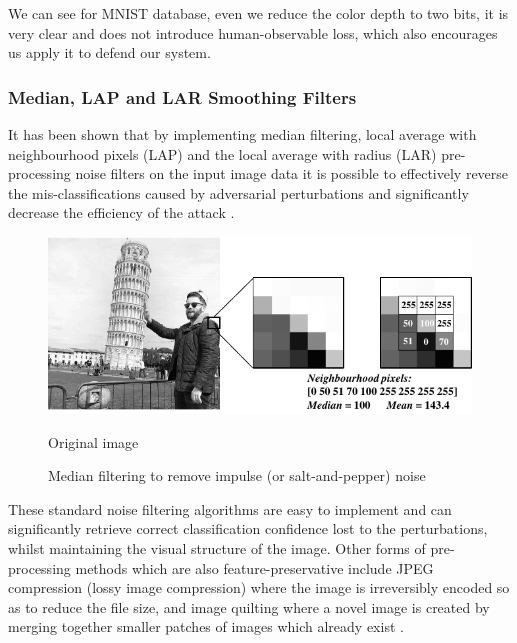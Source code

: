 We can see for MNIST database, even we reduce the color depth to two bits, it is very clear and does not introduce human-observable loss, which also encourages us apply it to defend our system. 


\subsubsection{Median, LAP and LAR Smoothing Filters}
It has been shown that by implementing median filtering, local average with neighbourhood pixels (LAP) and the local average with radius (LAR) pre-processing noise filters on the input image data it is possible to effectively reverse the mis-classifications caused by adversarial perturbations and significantly decrease the efficiency of the attack \cite{khalid2019fademl}. 

\begin{figure}[h!]
	\centering
		\includegraphics[width=.72\textwidth]{Diagram1-cropped.pdf}
		\caption{Original image}
		\label{fig: Median}
	\caption{Median filtering to remove impulse (or salt-and-pepper) noise}
\end{figure}
These standard noise filtering algorithms are easy to implement and can significantly retrieve correct classification confidence lost to the perturbations, whilst maintaining the visual structure of the image. Other forms of pre-processing methods which are also feature-preservative include JPEG compression (lossy image compression) where the image is irreversibly encoded so as to reduce the file size, and image quilting where a novel image is created by merging together smaller patches of images which already exist \cite{efros2001image}.


